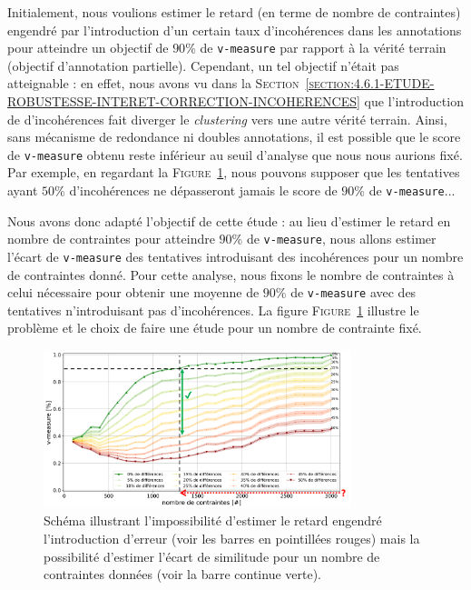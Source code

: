 		\begin{leftBarAuthorOpinion}
			
			Initialement, nous voulions estimer le retard (en terme de nombre de contraintes) engendré par l'introduction d'un certain taux d'incohérences dans les annotations pour atteindre un objectif de $90$\% de \texttt{v-measure} par rapport à la vérité terrain (objectif d'annotation partielle).
			Cependant, un tel objectif n'était pas atteignable : en effet, nous avons vu dans la \textsc{Section~\ref{section:4.6.1-ETUDE-ROBUSTESSE-INTERET-CORRECTION-INCOHERENCES}} que l'introduction de d'incohérences fait diverger le \textit{clustering} vers une autre vérité terrain.
			Ainsi, sans mécanisme de redondance ni doubles annotations, il est possible que le score de \texttt{v-measure} obtenu reste inférieur au seuil d'analyse que nous nous aurions fixé.
			Par exemple, en regardant la \textsc{Figure~\ref{figure:4.6.2-ETUDE-ROBUSTESSE-SIMULATION-IMPACT-DIFFERENCES}}, nous pouvons supposer que les tentatives ayant $50$\% d'incohérences ne dépasseront jamais le score de $90$\% de \texttt{v-measure}...
			
			Nous avons donc adapté l'objectif de cette étude : au lieu d'estimer le retard en nombre de contraintes pour atteindre $90$\% de \texttt{v-measure}, nous allons estimer l'écart de \texttt{v-measure} des tentatives introduisant des incohérences pour un nombre de contraintes donné.
			Pour cette analyse, nous fixons le nombre de contraintes à celui nécessaire pour obtenir une moyenne de $90$\% de \texttt{v-measure} avec des tentatives n'introduisant pas d'incohérences.
			La figure \textsc{Figure~\ref{figure:4.6.2-ETUDE-ROBUSTESSE-SIMULATION-IMPACT-DIFFERENCES}} illustre le problème et le choix de faire une étude pour un nombre de contrainte fixé.
			
			\begin{figure}[H]
				\centering
				\includegraphics[width=0.80\textwidth]{figures/etude-erreur-simulation-impact-schema}
				\caption{
					Schéma illustrant l'impossibilité d'estimer le retard engendré l'introduction d'erreur (voir les barres en pointillées rouges) mais la possibilité d'estimer l'écart de similitude pour un nombre de contraintes données (voir la barre continue verte).
				}
				\label{figure:4.6.2-ETUDE-ROBUSTESSE-SIMULATION-IMPACT-DIFFERENCES}
			\end{figure}
		\end{leftBarAuthorOpinion}
	
